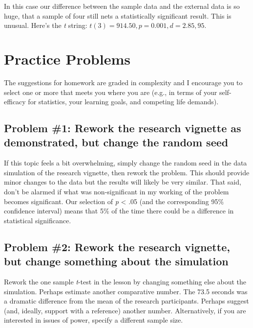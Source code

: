 \documentclass[
  11pt,
]{book}
\begin{document}
In this case our difference between the sample data and the external data is so huge, that a sample of four still nets a statistically significant result. This is unusual. Here's the \emph{t} string: \(t(3) = 914.50, p = 0.001, d = 2.85, 95%
\).

\hypertarget{practice-problems-1}{%
\section{Practice Problems}\label{practice-problems-1}}

The suggestions for homework are graded in complexity and I encourage you to select one or more that meets you where you are (e.g., in terms of your self-efficacy for statistics, your learning goals, and competing life demands).

\hypertarget{problem-1-rework-the-research-vignette-as-demonstrated-but-change-the-random-seed}{%
\subsection{Problem \#1: Rework the research vignette as demonstrated, but change the random seed}\label{problem-1-rework-the-research-vignette-as-demonstrated-but-change-the-random-seed}}

If this topic feels a bit overwhelming, simply change the random seed in the data simulation of the research vignette, then rework the problem. This should provide minor changes to the data but the results will likely be very similar. That said, don't be alarmed if what was non-significant in my working of the problem becomes significant. Our selection of \emph{p} \textless{} .05 (and the corresponding 95\% confidence interval) means that 5\% of the time there could be a difference in statistical significance.

\hypertarget{problem-2-rework-the-research-vignette-but-change-something-about-the-simulation}{%
\subsection{Problem \#2: Rework the research vignette, but change something about the simulation}\label{problem-2-rework-the-research-vignette-but-change-something-about-the-simulation}}

Rework the one sample \emph{t}-test in the lesson by changing something else about the simulation. Perhaps estimate another comparative number. The 73.5 seconds was a dramatic difference from the mean of the research participants. Perhaps suggest (and, ideally, support with a reference) another number. Alternatively, if you are interested in issues of power, specify a different sample size.
\end{document}
